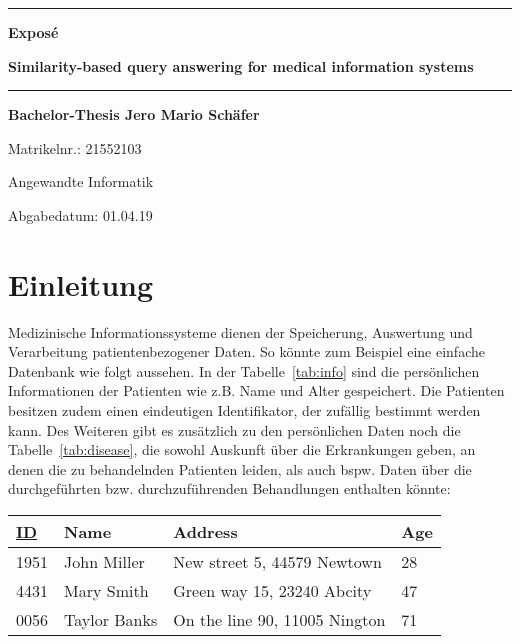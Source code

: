 \documentclass[a4paper, 11pt]{article}
\begin{document}
\newpage
\thispagestyle{empty}
\newcommand{\Rule}{\rule{\textwidth}{1mm}}

\begin{center}

\Rule\vspace{5mm}
\sffamily\bfseries\LARGE Exposé \par
\sffamily\bfseries\Huge Similarity-based query answering for medical information systems
\vspace{1mm}\Rule
\vfill
\sffamily\bfseries\LARGE Bachelor-Thesis
\vfill
\sffamily\bfseries\Large Jero Mario Schäfer\par Matrikelnr.: 21552103\par Angewandte Informatik\par
\vfill

\raisebox{7mm}{Georg-August-Universität}
\raisebox{7mm}{Göttingen}\par
\vfill
Abgabedatum: 01.04.19
\end{center}




\newpage
\section{Einleitung}

Medizinische Informationssysteme dienen der Speicherung, Auswertung und Verarbeitung patientenbezogener Daten. So könnte zum Beispiel eine einfache Datenbank
wie folgt aussehen. In der Tabelle~\ref{tab:info} sind die persönlichen Informationen der Patienten wie z.B. Name und Alter gespeichert. Die 
Patienten besitzen zudem einen eindeutigen Identifikator, der zufällig bestimmt werden kann. Des Weiteren gibt es zusätzlich zu den persönlichen Daten noch
die Tabelle~\ref{tab:disease}, die sowohl Auskunft über die Erkrankungen geben, an denen die zu behandelnden Patienten leiden, als auch bspw. Daten über die
durchgeführten bzw. durchzuführenden Behandlungen enthalten könnte: 
\\
\newcommand{\textoverline}[1]{$\overline{\mbox{#1}}$}
\begin{center}
\begin{tabular}{*{4}l} 
     \underline{ID} & Name & Address & Age \\
     \hline
     1951 & John Miller & New street 5, 44579 Newtown & 28 \\
     4431 & Mary Smith & Green way 15, 23240 Abcity & 47 \\
     0056 & Taylor Banks & On the line 90, 11005 Nington & 71 \\
\end{tabular}
 \label{tab:info}
\end{center}
\end{document}
